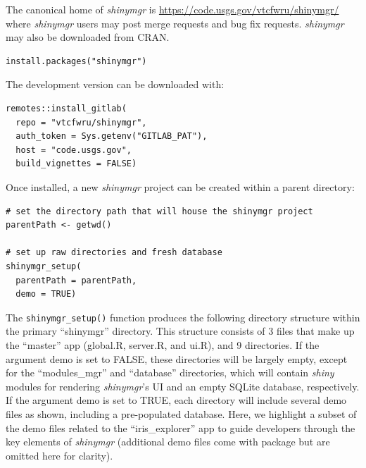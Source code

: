 The canonical home of \emph{shinymgr} is \url{https://code.usgs.gov/vtcfwru/shinymgr/} where \emph{shinymgr} users may post merge requests and bug fix requests. \emph{shinymgr} may also be downloaded from CRAN.

\begin{verbatim}
install.packages("shinymgr")
\end{verbatim}

The development version can be downloaded with:

\begin{verbatim}
remotes::install_gitlab(
  repo = "vtcfwru/shinymgr",
  auth_token = Sys.getenv("GITLAB_PAT"),
  host = "code.usgs.gov",
  build_vignettes = FALSE)
\end{verbatim}

Once installed, a new \emph{shinymgr} project can be created within a parent directory:

\begin{verbatim}
# set the directory path that will house the shinymgr project
parentPath <- getwd()

# set up raw directories and fresh database
shinymgr_setup(
  parentPath = parentPath, 
  demo = TRUE)
\end{verbatim}

The \texttt{shinymgr\_setup()} function produces the following directory structure within the primary ``shinymgr'' directory. This structure consists of 3 files that make up the ``master'' app (global.R, server.R, and ui.R), and 9 directories. If the argument demo is set to FALSE, these directories will be largely empty, except for the ``modules\_mgr'' and ``database'' directories, which will contain \emph{shiny} modules for rendering \emph{shinymgr}'s UI and an empty SQLite database, respectively. If the argument demo is set to TRUE, each directory will include several demo files as shown, including a pre-populated database. Here, we highlight a subset of the demo files related to the ``iris\_explorer'' app to guide developers through the key elements of \emph{shinymgr} (additional demo files come with package but are omitted here for clarity).

